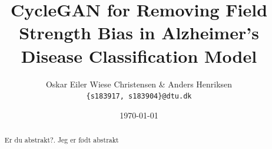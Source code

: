 \documentclass[12pt, fleqn, titlepage]{article}
\title{CycleGAN for Removing Field Strength Bias in Alzheimer's Disease Classification Model}
\author{Oskar Eiler Wiese Christensen \& Anders Henriksen \\ \texttt{\{s183917, s183904\}@dtu.dk}}
\date{\today}
\begin{document}
\maketitle
\begin{abstract}
	\small
	\noindent
	Er du abstrakt?. Jeg er født abstrakt
	
\end{abstract}
\end{document}
